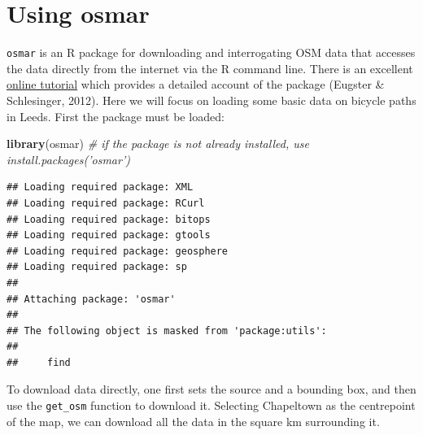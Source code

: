 \documentclass[]{article}
\newenvironment{Shaded}{}{}
\newcommand{\KeywordTok}[1]{\textcolor[rgb]{0.00,0.44,0.13}{\textbf{{#1}}}}
\newcommand{\CommentTok}[1]{\textcolor[rgb]{0.38,0.63,0.69}{\textit{{#1}}}}
\newcommand{\NormalTok}[1]{{#1}}
\begin{document}
\section{Using osmar}

\texttt{osmar} is an R package for downloading and interrogating OSM
data that accesses the data directly from the internet via the R command
line. There is an excellent
\href{http://journal.r-project.org/archive/2013-1/eugster-schlesinger.pdf}{online
tutorial} which provides a detailed account of the package (Eugster \&
Schlesinger, 2012). Here we will focus on loading some basic data on
bicycle paths in Leeds. First the package must be loaded:

\begin{Shaded}
\begin{Highlighting}[]
\KeywordTok{library}\NormalTok{(osmar)  }\CommentTok{# if the package is not already installed, use install.packages('osmar')}
\end{Highlighting}
\end{Shaded}
\begin{verbatim}
## Loading required package: XML
## Loading required package: RCurl
## Loading required package: bitops
## Loading required package: gtools
## Loading required package: geosphere
## Loading required package: sp
## 
## Attaching package: 'osmar'
## 
## The following object is masked from 'package:utils':
## 
##     find
\end{verbatim}
To download data directly, one first sets the source and a bounding box,
and then use the \texttt{get\_osm} function to download it. Selecting
Chapeltown as the centrepoint of the map, we can download all the data
in the square km surrounding it.
\end{document}
